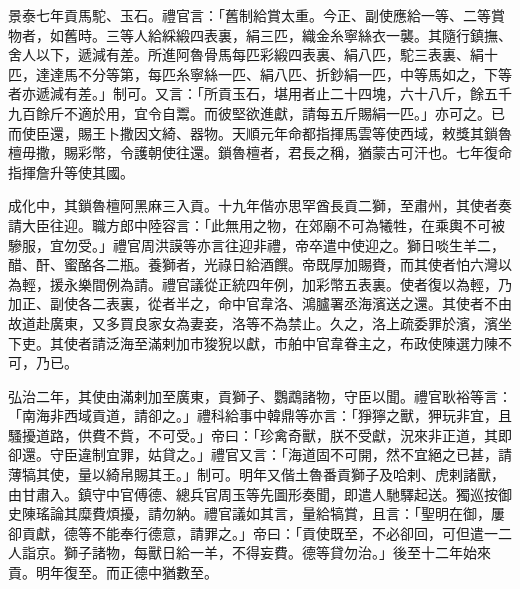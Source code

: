 \begin{pinyinscope}
景泰七年貢馬駝、玉石。禮官言：「舊制給賞太重。今正、副使應給一等、二等賞物者，如舊時。三等人給綵緞四表裏，絹三匹，織金糸寧絲衣一襲。其隨行鎮撫、舍人以下，遞減有差。所進阿魯骨馬每匹彩緞四表裏、絹八匹，駝三表裏、絹十匹，達達馬不分等第，每匹糸寧絲一匹、絹八匹、折鈔絹一匹，中等馬如之，下等者亦遞減有差。」制可。又言：「所貢玉石，堪用者止二十四塊，六十八斤，餘五千九百餘斤不適於用，宜令自鬻。而彼堅欲進獻，請每五斤賜絹一匹。」亦可之。已而使臣還，賜王卜撒因文綺、器物。天順元年命都指揮馬雲等使西域，敕獎其鎖魯檀毋撒，賜彩幣，令護朝使往還。鎖魯檀者，君長之稱，猶蒙古可汗也。七年復命指揮詹升等使其國。

成化中，其鎖魯檀阿黑麻三入貢。十九年偕亦思罕酋長貢二獅，至肅州，其使者奏請大臣往迎。職方郎中陸容言：「此無用之物，在郊廟不可為犧牲，在乘輿不可被驂服，宜勿受。」禮官周洪謨等亦言往迎非禮，帝卒遣中使迎之。獅日啖生羊二，醋、酐、蜜酪各二瓶。養獅者，光祿日給酒饌。帝既厚加賜賚，而其使者怕六灣以為輕，援永樂間例為請。禮官議從正統四年例，加彩幣五表裏。使者復以為輕，乃加正、副使各二表裏，從者半之，命中官韋洛、鴻臚署丞海濱送之還。其使者不由故道赴廣東，又多買良家女為妻妾，洛等不為禁止。久之，洛上疏委罪於濱，濱坐下吏。其使者請泛海至滿剌加市狻猊以獻，市舶中官韋眷主之，布政使陳選力陳不可，乃已。

弘治二年，其使由滿剌加至廣東，貢獅子、鸚鵡諸物，守臣以聞。禮官耿裕等言：「南海非西域貢道，請卻之。」禮科給事中韓鼎等亦言：「猙獰之獸，狎玩非宜，且騷擾道路，供費不貲，不可受。」帝曰：「珍禽奇獸，朕不受獻，況來非正道，其即卻還。守臣違制宜罪，姑貸之。」禮官又言：「海道固不可開，然不宜絕之已甚，請薄犒其使，量以綺帛賜其王。」制可。明年又偕土魯番貢獅子及哈剌、虎剌諸獸，由甘肅入。鎮守中官傅德、總兵官周玉等先圖形奏聞，即遣人馳驛起送。獨巡按御史陳瑤論其糜費煩擾，請勿納。禮官議如其言，量給犒賞，且言：「聖明在御，屢卻貢獻，德等不能奉行德意，請罪之。」帝曰：「貢使既至，不必卻回，可但遣一二人詣京。獅子諸物，每獸日給一羊，不得妄費。德等貸勿治。」後至十二年始來貢。明年復至。而正德中猶數至。


\end{pinyinscope}
